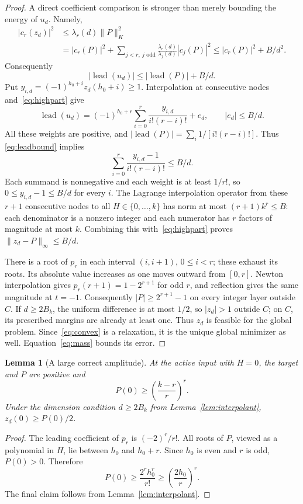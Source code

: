 \documentclass[11pt,a4paper]{article}
\newtheorem{lemma}[theorem]{Lemma}
\theoremstyle{remark}\newtheorem{remark}[theorem]{Remark}
\newcommand{\normK}[1]{\lVert #1\rVert_K}
\begin{document}
\begin{proof}
A direct coefficient comparison is stronger than merely bounding the
energy of $u_d$. Namely,
\begin{align*}
 |c_r(z_d)|^2
 &\le\lambda_r(d)\normK P^2\\
 &=|c_r(P)|^2+
   \sum_{j<r,\ j\text{ odd}}
        \frac{\lambda_r(d)}{\lambda_j(d)}|c_j(P)|^2
 \le |c_r(P)|^2+B/d^2.
\end{align*}
Consequently
\begin{equation}\label{eq:leadbound}
 |\operatorname{lead}(u_d)|\le|\operatorname{lead}(P)|+B/d.
\end{equation}
Put $y_{i,d}=(-1)^{h_0+i}z_d(h_0+i)\ge1$. Interpolation at consecutive
nodes and~\eqref{eq:highpart} give
\[
 \operatorname{lead}(u_d)=
 (-1)^{h_0+r}\sum_{i=0}^r\frac{y_{i,d}}{i!(r-i)!}+e_d,
 \qquad |e_d|\le B/d.
\]
All these weights are positive, and
$|\operatorname{lead}(P)|=\sum_i1/[i!(r-i)!]$. Thus
\eqref{eq:leadbound} implies
\[
 \sum_{i=0}^r\frac{y_{i,d}-1}{i!(r-i)!}\le B/d.
\]
Each summand is nonnegative and each weight is at least $1/r!$, so
$0\le y_{i,d}-1\le B/d$ for every $i$. The Lagrange interpolation
operator from these $r+1$ consecutive nodes to all $H\in\{0,\ldots,k\}$
has norm at most $(r+1)k^r\le B$: each denominator is a nonzero integer
and each numerator has $r$ factors of magnitude at most $k$.
Combining this with~\eqref{eq:highpart} proves
$\|z_d-P\|_\infty\le B/d$.

There is a root of $p_r$ in each interval $(i,i+1)$, $0\le i<r$;
these exhaust its roots. Its absolute value increases as one moves
outward from $[0,r]$. Newton interpolation gives
$p_r(r+1)=1-2^{r+1}$ for odd $r$, and reflection gives the same
magnitude at $t=-1$. Consequently $|P|\ge2^{r+1}-1$ on every integer
layer outside $C$. If $d\ge2B_k$, the uniform difference is at most
$1/2$, so $|z_d|>1$ outside $C$; on $C$, its prescribed margins are
already at least one. Thus $z_d$ is feasible for the global problem.
Since~\eqref{eq:convex} is a relaxation, it is the unique global minimizer
as well. Equation~\eqref{eq:mass} bounds its error.
\end{proof}

\begin{lemma}[A large correct amplitude]\label{lem:amplitude}
At the active input with $H=0$, the target and $P$ are positive and
\[
 P(0)\ge\left(\frac{k-r}{r}\right)^r.
\]
Under the dimension condition $d\ge2B_k$ from
Lemma~\ref{lem:interpolant}, $z_d(0)\ge P(0)/2$.
\end{lemma}
\begin{proof}
The leading coefficient of $p_r$ is $(-2)^r/r!$. All roots of $P$,
viewed as a polynomial in $H$, lie between $h_0$ and $h_0+r$. Since
$h_0$ is even and $r$ is odd, $P(0)>0$. Therefore
\[
 P(0)\ge\frac{2^r h_0^r}{r!}
       \ge\left(\frac{2h_0}{r}\right)^r.
\]
The final claim follows from Lemma~\ref{lem:interpolant}.
\end{proof}
\end{document}
